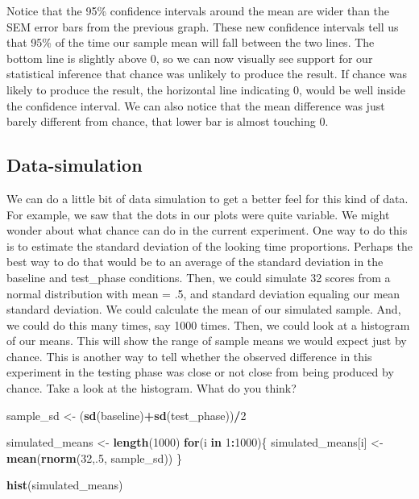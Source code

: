 \documentclass[
]{book}
\newenvironment{Shaded}{\begin{snugshade}}{\end{snugshade}}
\newcommand{\ControlFlowTok}[1]{\textcolor[rgb]{0.13,0.29,0.53}{\textbf{#1}}}
\newcommand{\DecValTok}[1]{\textcolor[rgb]{0.00,0.00,0.81}{#1}}
\newcommand{\FunctionTok}[1]{\textcolor[rgb]{0.13,0.29,0.53}{\textbf{#1}}}
\newcommand{\NormalTok}[1]{#1}
\newcommand{\OtherTok}[1]{\textcolor[rgb]{0.56,0.35,0.01}{#1}}
\newcommand{\SpecialCharTok}[1]{\textcolor[rgb]{0.81,0.36,0.00}{\textbf{#1}}}
\begin{document}
Notice that the 95\% confidence intervals around the mean are wider than the SEM error bars from the previous graph. These new confidence intervals tell us that 95\% of the time our sample mean will fall between the two lines. The bottom line is slightly above 0, so we can now visually see support for our statistical inference that chance was unlikely to produce the result. If chance was likely to produce the result, the horizontal line indicating 0, would be well inside the confidence interval. We can also notice that the mean difference was just barely different from chance, that lower bar is almost touching 0.

\hypertarget{data-simulation}{%
\subsection{Data-simulation}\label{data-simulation}}

We can do a little bit of data simulation to get a better feel for this kind of data. For example, we saw that the dots in our plots were quite variable. We might wonder about what chance can do in the current experiment. One way to do this is to estimate the standard deviation of the looking time proportions. Perhaps the best way to do that would be to an average of the standard deviation in the baseline and test\_phase conditions. Then, we could simulate 32 scores from a normal distribution with mean = .5, and standard deviation equaling our mean standard deviation. We could calculate the mean of our simulated sample. And, we could do this many times, say 1000 times. Then, we could look at a histogram of our means. This will show the range of sample means we would expect just by chance. This is another way to tell whether the observed difference in this experiment in the testing phase was close or not close from being produced by chance. Take a look at the histogram. What do you think?

\begin{Shaded}
\begin{Highlighting}[]
\NormalTok{sample\_sd   }\OtherTok{\textless{}{-}}\NormalTok{ (}\FunctionTok{sd}\NormalTok{(baseline)}\SpecialCharTok{+}\FunctionTok{sd}\NormalTok{(test\_phase))}\SpecialCharTok{/}\DecValTok{2}

\NormalTok{simulated\_means }\OtherTok{\textless{}{-}} \FunctionTok{length}\NormalTok{(}\DecValTok{1000}\NormalTok{)}
\ControlFlowTok{for}\NormalTok{(i }\ControlFlowTok{in} \DecValTok{1}\SpecialCharTok{:}\DecValTok{1000}\NormalTok{)\{}
\NormalTok{ simulated\_means[i] }\OtherTok{\textless{}{-}} \FunctionTok{mean}\NormalTok{(}\FunctionTok{rnorm}\NormalTok{(}\DecValTok{32}\NormalTok{,.}\DecValTok{5}\NormalTok{, sample\_sd))}
\NormalTok{\}}

\FunctionTok{hist}\NormalTok{(simulated\_means)}
\end{Highlighting}
\end{Shaded}
\end{document}
